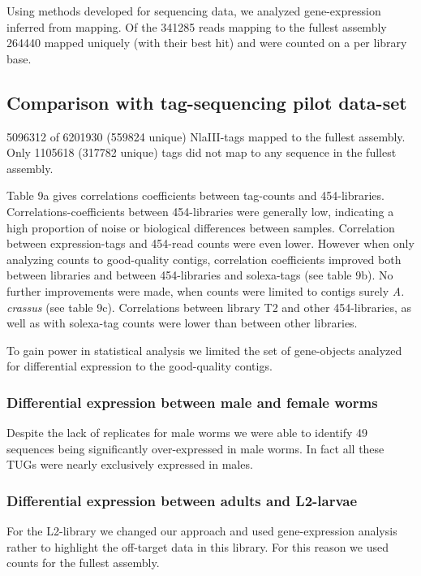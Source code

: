\documentclass[10pt]{bmc_article}
\newenvironment{bmcformat}{\begin{raggedright}\baselineskip20pt\sloppy\setboolean{publ}{false}}{\end{raggedright}\baselineskip20pt\sloppy}
\begin{document}
\begin{bmcformat}
Using methods developed for sequencing data, we analyzed
gene-expression inferred from mapping. Of the 341285 reads
mapping to the fullest assembly 264440 mapped uniquely
(with their best hit) and were counted on a per library base.

\subsection*{Comparison with tag-sequencing pilot data-set}


5096312 of 6201930 (559824 unique) NlaIII-tags
mapped to the fullest assembly. Only 1105618
(317782 unique) tags did not map to any sequence in the
fullest assembly.

Table 9a gives correlations coefficients between tag-counts and
454-libraries. Correlations-coefficients between 454-libraries were
generally low, indicating a high proportion of noise or biological
differences between samples. Correlation between expression-tags and
454-read counts were even lower. However when only analyzing counts to
good-quality contigs, correlation coefficients improved both between
libraries and between 454-libraries and solexa-tags (see table 9b). No
further improvements were made, when counts were limited to contigs
surely \textit{A. crassus} (see table 9c). Correlations between
library T2 and other 454-libraries, as well as with solexa-tag counts
were lower than between other libraries.

To gain power in statistical analysis we limited the set of
gene-objects analyzed for differential expression to the good-quality
contigs.

\subsubsection*{Differential expression between male and female worms}

Despite the lack of replicates for male worms we were able to identify
49 sequences being significantly
over-expressed in male worms. In fact all these TUGs were nearly
exclusively expressed in males. 

\subsubsection*{Differential expression between adults and L2-larvae}

For the L2-library we changed our approach and used gene-expression
analysis rather to highlight the off-target data in this library. For
this reason we used counts for the fullest assembly.


\end{bmcformat}
\end{document}
